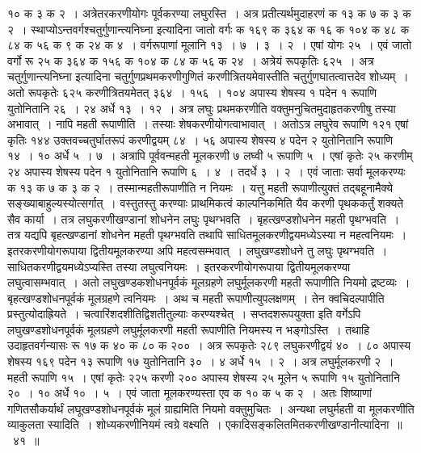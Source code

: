 \documentclass[11pt, openany]{book}
\begin{document}
{{१० क ३ क २~। अत्रेतरकरणीयोगः पूर्वकरण्या लघुरस्ति~। अत्र
प्रतीत्यर्थमुदाहरणं 
क १३ क ७ क ३ क २~। {\qt स्थाप्योऽन्तवर्गश्चतुर्गुणान्त्यनिघ्ना} इत्यादिना
जातो वर्गः क १६९ क ३६४ क १६ क १०४ क ४८ क ८४ क ५६ क 
९ क २४ क ४~। वर्गरूपाणां मूलानि १३~। ७~। ३~। २~। एषां योगः २५~। 
एवं जातो वर्गो रू २५ क ३६४ क १५६ क १०४ क ८४ क ५६ क २४~। 
अत्रेयं रूपकृतिः ६२५~। अत्र {\qt चतुर्गुणान्त्यनिघ्ना} इत्यादिना
चतुर्गुणप्रथमकरणीगुणितं करणीत्रितयमेवास्तीति चतुर्गुणघातत्वात्तदेव शोध्यम्~। अतो
रूपकृतेः 
६२५ करणीत्रितयमेतत् ३६४~। १५६~। १०४ अपास्य शेषस्य १ पदेन १ रूपाणि 
युतोनितानि २६~। २४ अर्धे १३~। १२~। अत्र लघुः प्रथमकरणीति वक्तुमनुचितमुदाहृतकरणीषु तस्या अभावात्~। नापि महती रूपाणीति~। तस्याः
शेषकरणीयोगत्वाभावात्~। अतोऽत्र लघुरेव रूपाणि १२१ एषां कृतिः १४४
उक्तवच्चतुर्घातरूपं 
करणीद्वयम् ८४~। ५६ अपास्य शेषस्य ४ पदेन २ युतोनितानि रूपाणि १४~। १० 
अर्धे ५~। ७~। अत्रापि पूर्ववन्महती मूलकरणी ७ लघ्वी ५ रूपाणि ५~। एषां 
कृतेः २५ करणीम् २४ अपास्य शेषस्य पदेन १ युतोनितानि रूपाणि ६~। ४~। 
तदर्धे ३~। २~। एवं जाताः सर्वा मूलकरण्यः क १३ क ७ क ३ क २~। तस्मान्महतीरूपाणीति न नियमः~। यत्तु महती रूपाणीत्युक्तं तद्बहूनामैक्ये
सङ्ख्याबाहुल्यस्योत्सर्गात्~। वस्तुतस्तु करण्याः प्राथमिकत्वं काल्पनिकमिति यैव करणी
पृथककर्तुं शक्यते सैव कार्या~। तत्र लघुकरणीखण्डानां शोधनेन लघुः
पृथग्भवति~। बृहत्खण्डशोधनेन महती पृथग्भवति~। तत्र यद्यपि बृहत्खण्डानां
शोधनेन महती पृथग्भवति तथापि साधितमूलकरणीद्वयमध्येऽस्या न महत्वनियमः~।
इतरकरणीयोगरूपाया द्वितीयमूलकरण्या अपि महत्वसम्भवात्~। लघुखण्डशोधने तु
लघुः पृथग्भवति~। साधितकरणीद्वयमध्येऽप्यस्ति तस्या लघुत्वनियमः~।
इतरकरणीयोगरूपाया द्वितीयमूलकरण्या लघुत्वासम्भवात्~। अतो लघुखण्डकशोधनपूर्वकं मूलग्रहणे लघुर्मूलकरणी महती रूपाणीति नियमो द्रष्टव्यः~।
बृहत्खण्डशोधनपूर्वकं मूलग्रहणे त्वनियमः~। अथ च महती रूपाणीत्युपलक्षणम्~।
तेन क्वचिदल्पापीति प्रस्तुत्योदाह्रियते~। चत्वारिंशदशीतिद्विशतीतुल्याः
करण्यश्चेत्~। सप्तदशरूपयुक्ता इति वर्गेऽपि लघुखण्डशोधनपूर्वकं 
मूलग्रहणे लघुर्मूलकरणी महती रूपाणीति नियमस्य न भङ्गोऽस्ति~। तथाहि\textendash\ 
\newpage
\noindent उदाहृतवर्गन्यासः रू १७ क ४० क ८० क २००~। अत्र रूपकृतेः २८९ लघुकरणीद्वयं ४०~। ८० अपास्य शेषस्य १६९ पदेन १३ रूपाणि १७ युतोनितानि ३०~। ४ अर्धे १५~। २~। अत्र लघुर्मूलकरणी २~। महती रूपाणि १५~। एषां कृतेः 
२२५ करणी २०० अपास्य शेषस्य २५ मूलेन ५ रूपाणि १५ युतोनितानि २०~। 
१० अर्धे १०~। ५~। एवं जाता मूलकरण्यस्ता एव क १० क ५ क २~। अतः 
शिष्याणां गणितसौकर्यार्थं लघूखण्डशोधनपूर्वकं मूलं ग्राह्यमिति नियमो
वक्तुमुचितः~। 
अन्यथा लघुर्महती वा मूलकरणीति व्याकुलता स्यादिति~। शोध्यकरणीनियमं
त्वग्रे वक्ष्यति~। एकादिसङ्कलितमितकरणीखण्डानीत्यादिना~॥~४१~॥\\

}}
\end{document}

